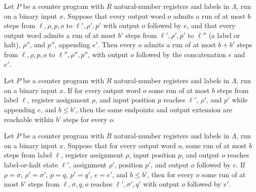 \begin{theorem}
\label{Complexity.CounterProg.Goes.trans}
\leanok
{}
Let $P$ be a counter program with $R$ natural-number registers and labels in $\Lambda$,
run on a binary input $x$. Suppose that every output word $o$ admits a run of at most
$b$ steps from $\ell,\rho,p,o$ to $\ell',\rho',p'$ with output $o$ followed by $e$,
and that every output word admits a run of at most $b'$ steps from $\ell',\rho',p'$ to
$\ell''$ (a label or halt), $\rho''$, and $p''$, appending $e'$. Then every $o$ admits a
run of at most $b+b'$ steps from $\ell,\rho,p,o$ to $\ell'',\rho'',p''$, with output $o$
followed by the concatenation $e$ and $e'$.
\end{theorem}

\begin{theorem}
\label{Complexity.CounterProg.Goes.mono}
\leanok
{}
Let $P$ be a counter program with $R$ natural-number registers and labels in $\Lambda$,
run on a binary input $x$. If for every output word $o$ some run of at most $b$ steps
from label $\ell$, register assignment $\rho$, and input position $p$ reaches $\ell'$,
$\rho'$, and $p'$ while appending $e$, and $b\le b'$, then the same endpoints and output
extension are reachable within $b'$ steps for every $o$.
\end{theorem}

\begin{theorem}
\label{Complexity.CounterProg.Goes.congr}
\leanok
{}
Let $P$ be a counter program with $R$ natural-number registers and labels in $\Lambda$,
run on a binary input $x$. Suppose that for every output word $o$, some run of at most
$b$ steps from label $\ell$, register assignment $\rho$, input position $p$, and output
$o$ reaches label-or-halt state $\ell'$, assignment $\rho'$, position $p'$, and output
$o$ followed by $e$. If $\rho=\sigma$, $\rho'=\sigma'$, $p=q$, $p'=q'$, $e=e'$, and
$b\le b'$, then for every $o$ some run of at most $b'$ steps from $\ell,\sigma,q,o$
reaches $\ell',\sigma',q'$ with output $o$ followed by $e'$.
\end{theorem}

